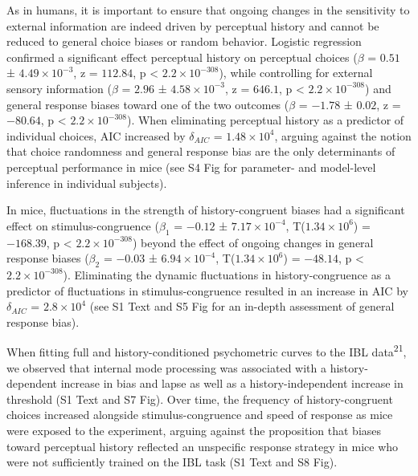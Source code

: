 \documentclass[
]{article}
\begin{document}
As in humans, it is important to ensure that ongoing changes in the
sensitivity to external information are indeed driven by perceptual
history and cannot be reduced to general choice biases or random
behavior. Logistic regression confirmed a significant effect perceptual
history on perceptual choices (\(\beta\) = \(0.51\) ±
\(\ensuremath{4.49\times 10^{-3}}\), z = \(112.84\), p < \(\ensuremath{2.2\times 10^{-308}}\)), while
controlling for external sensory information (\(\beta\) = \(2.96\) ±
\(\ensuremath{4.58\times 10^{-3}}\), z = \(646.1\), p < \(\ensuremath{2.2\times 10^{-308}}\)) and
general response biases toward one of the two outcomes (\(\beta\) =
\(-1.78\) ± \(0.02\), z = \(-80.64\), p < \(\ensuremath{2.2\times 10^{-308}}\)). When eliminating
perceptual history as a predictor of individual choices, AIC increased
by \(\delta_{AIC}\) = \(\ensuremath{1.48\times 10^{4}}\), arguing
against the notion that choice randomness and general response bias are
the only determinants of perceptual performance in mice (see
S4 Fig for parameter- and model-level inference in
individual subjects).

In mice, fluctuations in the strength of history-congruent biases had a
significant effect on stimulus-congruence (\(\beta_1\) = \(-0.12\) ±
\(\ensuremath{7.17\times 10^{-4}}\),
T(\(\ensuremath{1.34\times 10^{6}}\)) = \(-168.39\), p < \(\ensuremath{2.2\times 10^{-308}}\)) beyond
the effect of ongoing changes in general response biases (\(\beta_2\) =
\(-0.03\) ± \(\ensuremath{6.94\times 10^{-4}}\),
T(\(\ensuremath{1.34\times 10^{6}}\)) = \(-48.14\), p < \(\ensuremath{2.2\times 10^{-308}}\)).
Eliminating the dynamic fluctuations in history-congruence as a
predictor of fluctuations in stimulus-congruence resulted in an increase
in AIC by \(\delta_{AIC}\) = \(\ensuremath{2.8\times 10^{4}}\) (see
S1 Text and S5 Fig for an in-depth
assessment of general response bias).

When fitting full and history-conditioned psychometric curves to the IBL
data\textsuperscript{21}, we observed that internal mode processing was
associated with a history-dependent increase in bias and lapse as well
as a history-independent increase in threshold (S1 Text and S7 Fig). Over time, the frequency of
history-congruent choices increased alongside stimulus-congruence and
speed of response as mice were exposed to the experiment, arguing
against the proposition that biases toward perceptual history reflected
an unspecific response strategy in mice who were not sufficiently
trained on the IBL task (S1 Text and S8 Fig).
\end{document}
